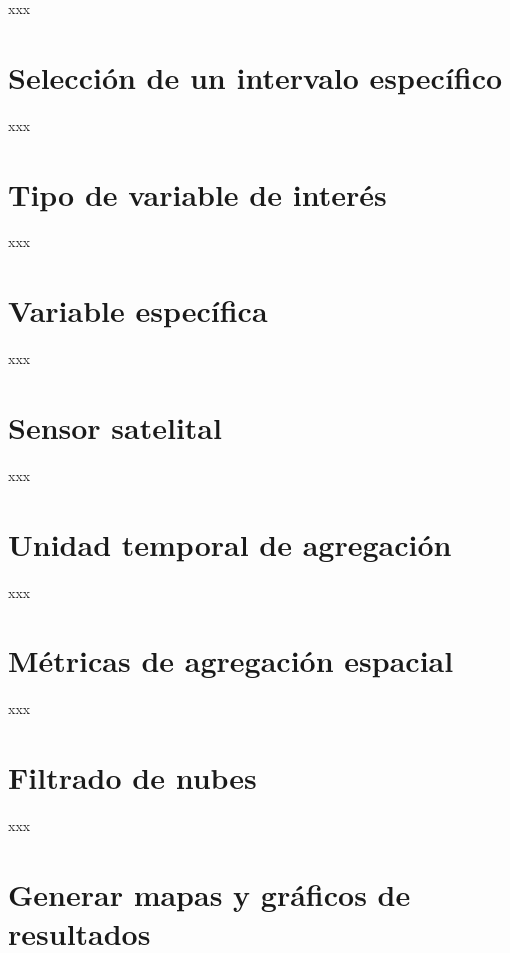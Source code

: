 \documentclass[
]{book}
\begin{document}
xxx

\chapter{Selección de un intervalo específico}\label{selecciuxf3n-de-un-intervalo-especuxedfico}

xxx

\chapter{Tipo de variable de interés}\label{tipo-de-variable-de-interuxe9s}

xxx

\chapter{Variable específica}\label{variable-especuxedfica}

xxx

\chapter{Sensor satelital}\label{sensor-satelital}

xxx

\chapter{Unidad temporal de agregación}\label{unidad-temporal-de-agregaciuxf3n}

xxx

\chapter{Métricas de agregación espacial}\label{muxe9tricas-de-agregaciuxf3n-espacial}

xxx

\chapter{Filtrado de nubes}\label{filtrado-de-nubes}

xxx

\chapter{Generar mapas y gráficos de resultados}\label{generar-mapas-y-gruxe1ficos-de-resultados}


\end{document}
